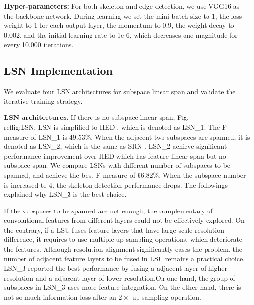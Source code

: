 \documentclass[runningheads]{llncs}
\begin{document}
\textbf{Hyper-parameters:} For both skeleton and edge detection, we use VGG16 \cite{ref34} as the backbone network. During learning we set the mini-batch size to 1, the loss-weight  to 1 for each output layer, the momentum to 0.9, the weight decay to 0.002, and the initial learning rate to 1e-6, which decreases one magnitude for every 10,000 iterations. 

\subsection{LSN Implementation}

We evaluate four LSN architectures for subspace linear span and validate the iterative training strategy. 

\textbf{LSN architectures.}
If there is no subspace linear span, Fig.\\ref{fig:LSN}, LSN is simplified to HED \cite{ref6}, which is denoted as LSN\_1. The F-measure of LSN\_1 is 49.53\%. When the adjacent two subspaces are spanned, it is denoted as LSN\_2, which is the same as SRN \cite{ref1}. LSN\_2 achieve significant performance improvement over HED which has feature linear span but no subspace span. We compare LSNs with different number of subspaces to be spanned, and achieve the best F-measure of 66.82\%. When the subspace number is increased to 4, the skeleton detection performance drops. The followings explained why LSN\_3 is the best choice.

If the subspaces to be spanned are not enough, the complementary of convolutional features from different layers could not be effectively explored. On the contrary, if a LSU fuses feature layers that have large-scale resolution difference, it requires to use multiple up-sampling operations, which deteriorate the features. Although resolution alignment significantly eases the problem, the number of adjacent feature layers to be fused in LSU remains a practical choice. LSN\_3 reported the best performance by fusing a adjacent layer of higher resolution and a adjacent layer of lower resolution.On one hand, the group of subspaces in LSN\_3 uses more feature integration. On the other hand, there is not so much information loss after an $2\times$ up-sampling operation.
\end{document}
